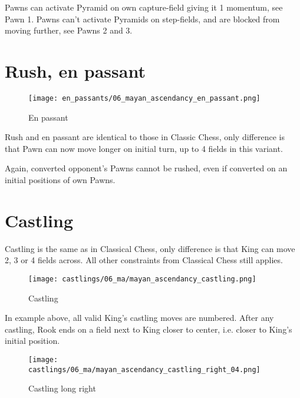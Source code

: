Pawns can activate Pyramid on own capture-field giving it 1 momentum, see Pawn 1.
Pawns can't activate Pyramids on step-fields, and are blocked from moving further,
see Pawns 2 and 3.

\clearpage %

\section*{Rush, en passant}
\label{sec:Mayan Ascendancy/Rush, en passant}

\noindent
\begin{wrapfigure}{l}{0.4\textwidth}
\centering
\texttt{[image: en\_passants/06\_mayan\_ascendancy\_en\_passant.png]}
\caption{En passant}
\label{fig:06_mayan_ascendancy_en_passant}
\end{wrapfigure}
Rush and en passant are identical to those in Classic Chess, only difference
is that Pawn can now move longer on initial turn, up to 4 fields in this
variant.

Again, converted opponent's Pawns cannot be rushed, even if converted on an
initial positions of own Pawns.

\clearpage %

\section*{Castling}
\label{sec:Mayan Ascendancy/Castling}

Castling is the same as in Classical Chess, only difference is that King can move 2, 3 or 4 fields across.
All other constraints from Classical Chess still applies.

\noindent
\begin{figure}[!h]
\texttt{[image: castlings/06\_ma/mayan\_ascendancy\_castling.png]}
\caption{Castling}
\label{fig:mayan_ascendancy_castling}
\end{figure}

In example above, all valid King's castling moves are numbered. After any castling, Rook
ends on a field next to King closer to center, i.e. closer to King's initial position.

\noindent
\begin{figure}[!h]
\texttt{[image: castlings/06\_ma/mayan\_ascendancy\_castling\_right\_04.png]}
\caption{Castling long right}
\label{fig:mayan_ascendancy_castling_right_04}
\end{figure}

